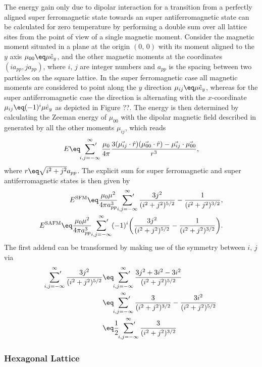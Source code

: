\documentclass[\main/dresen_thesis.tex]{subfiles}
\begin{document}
    The energy gain only due to dipolar interaction for a transition from a perfectly aligned super ferromagnetic state towards an super antiferromagnetic state can be calculated for zero temperature by performing a double sum over all lattice sites from the point of view of a single magnetic moment.
    Consider the magnetic moment situated in a plane at the origin $(0, \,0)$ with its moment aligned to the $y$ axis $\mu_{00} \eq \mu \hat{e}_y$, and the other magnetic moments at the coordinates $(i a_{pp}, j a_{pp})$, where $i,\, j$ are integer numbers and $a_{pp}$ is the spacing between two particles on the square lattice.
    In the super ferromagnetic case all magnetic moments are considered to point along the $y$ direction $\mu_{ij} \eq \mu \hat{e}_y$, whereas for the super antiferromagnetic case the direction is alternating with the $x$-coordinate $\mu_{ij} \eq (-1)^i \mu \hat{e}_y$ as depicted in Figure ??.
    The energy is then determined by calculating the Zeeman energy of $\mu_{00}$ with the dipolar magnetic field described in  generated by all the other moments $\mu_{ij}$, which reads
    \begin{align}
      E \eq \sideset{}{'}\sum_{i,j=-\infty}^\infty \frac{\mu_0}{4 \pi} \frac{3(\vec{\mu_{ij}} \cdot \hat{r})(\vec{\mu_{00}} \cdot \hat{r}) - \vec{\mu_{ij}} \cdot \vec{\mu_{00}} }{r^3},
    \end{align}
    where $r \eq \sqrt{i^2 + j^2} a_{pp}$.
    The explicit sum for super ferromagnetic and super antiferromagnetic states is then given by
    \begin{align}
      E^\mathrm{SFM} \eq \frac{\mu_0 \mu^2}{4 \pi a^3_{pp}} \sideset{}{'}\sum_{i,j=-\infty}^\infty  \frac{3j^2}{(i^2 + j^2)^{5/2}} - \frac{1}{(i^2 + j^2)^{3/2}} ,\\
      E^\mathrm{SAFM} \eq \frac{\mu_0 \mu^2}{4 \pi a^3_{pp}} \sideset{}{'}\sum_{i,j=-\infty}^\infty (-1)^i \biggl( \frac{3j^2}{(i^2 + j^2)^{5/2}} - \frac{1}{(i^2 + j^2)^{3/2}} \biggr).
    \end{align}
    The first addend can be transformed by making use of the symmetry between $i,\,j$ via
    \begin{align}
      \sideset{}{'}\sum_{i,j=-\infty}^\infty \frac{3j^2}{(i^2 + j^2)^{5/2}} \eq& \sideset{}{'}\sum_{i,j=-\infty}^\infty \frac{3j^2 + 3i^2 - 3i^2}{(i^2 + j^2)^{5/2}}\\
      \eq& \sideset{}{'}\sum_{i,j=-\infty}^\infty \frac{3}{(i^2 + j^2)^{3/2}} - \frac{3 i^2}{(i^2 + j^2)^{5/2}} \\
      \eq& \frac{1}{2} \sideset{}{'}\sum_{i,j=-\infty}^\infty \frac{3}{(i^2 + j^2)^{3/2}}
    \end{align}
  \subsubsection{Hexagonal Lattice}
\end{document}
